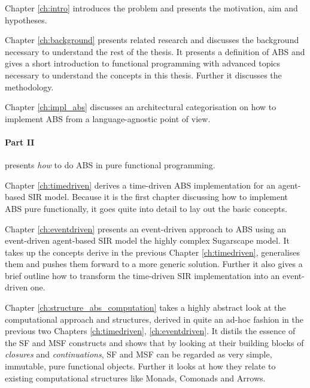 Chapter \ref{ch:intro} introduces the problem and presents the motivation, aim and hypotheses.

\medskip

Chapter \ref{ch:background} presents related research and discusses the background necessary to understand the rest of the thesis. It presents a definition of ABS and gives a short introduction to functional programming with advanced topics necessary to understand the concepts in this thesis. Further it discusses the methodology.

\medskip

Chapter \ref{ch:impl_abs} discusses an architectural categorisation on how to implement ABS from a language-agnostic point of view. 

\medskip

\paragraph{Part II} presents \textit{how} to do ABS in pure functional programming. 
\medskip

Chapter \ref{ch:timedriven} derives a time-driven ABS implementation for an agent-based SIR model. Because it is the first chapter discussing how to implement ABS pure functionally, it goes quite into detail to lay out the basic concepts.

\medskip

Chapter \ref{ch:eventdriven} presents an event-driven approach to ABS using an event-driven agent-based SIR model the highly complex Sugarscape model. It takes up the concepts derive in the previous Chapter \ref{ch:timedriven}, generalises them and pushes them forward to a more generic solution. Further it also gives a brief outline how to transform the time-driven SIR implementation into an event-driven one.

\medskip

Chapter \ref{ch:structure_abs_computation} takes a highly abstract look at the computational approach and structures, derived in quite an ad-hoc fashion in the previous two Chapters \ref{ch:timedriven}, \ref{ch:eventdriven}. It distils the essence of the SF and MSF constructs and shows that by looking at their building blocks of \textit{closures} and \textit{continuations}, SF and MSF can be regarded as very simple, immutable, pure functional objects. Further it looks at how they relate to existing computational structures like Monads, Comonads and Arrows.

\medskip

